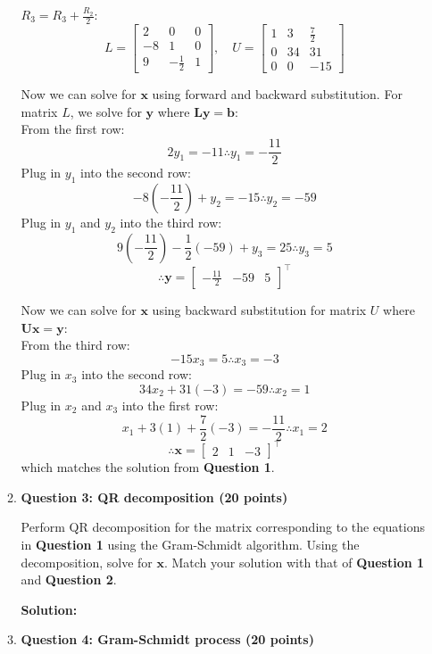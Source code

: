 \documentclass[11pt,letterpaper]{article}
\begin{document}
\begin{enumerate}
\begin{enumerate}
$R_3 = R_3 + \frac{R_2}{2}$:
\[L = \begin{bmatrix}
2 & 0 & 0 \\
-8 & 1 & 0 \\
9 & -\frac{1}{2} & 1
\end{bmatrix}, \quad U = \begin{bmatrix}
1 & 3 & \frac{7}{2} \\
0 & 34 & 31 \\
0 & 0 & -15
\end{bmatrix}\]

Now we can solve for $\mathbf{x}$ using forward and backward substitution. For 
matrix $L$, we solve for $\mathbf{y}$ where $\mathbf{Ly} = \mathbf{b}$: \\
From the first row:
\[2y_1 = -11 \therefore y_1 = -\frac{11}{2}\]
Plug in $y_1$ into the second row:
\[-8(-\frac{11}{2}) + y_2 = -15 \therefore y_2 = -59\]
Plug in $y_1$ and $y_2$ into the third row:
\[9(-\frac{11}{2}) - \frac{1}{2}(-59) + y_3 = 25 \therefore y_3 = 5\]
\[\therefore \mathbf{y} = \begin{bmatrix} -\frac{11}{2} & -59 & 5 \end{bmatrix}^\top\]

Now we can solve for $\mathbf{x}$ using backward substitution for matrix $U$ where $\mathbf{Ux} = \mathbf{y}$: \\
From the third row:
\[-15x_3 = 5 \therefore x_3 = -3\]
Plug in $x_3$ into the second row:
\[34x_2 + 31(-3) = -59 \therefore x_2 = 1\]
Plug in $x_2$ and $x_3$ into the first row:
\[x_1 + 3(1) + \frac{7}{2}(-3) = -\frac{11}{2} \therefore x_1 = 2\]
\[\therefore \mathbf{x} = \begin{bmatrix} 2 & 1 & -3 \end{bmatrix}^\top\] which
matches the solution from \textbf{Question 1}.

\newpage

\item[] \textbf{Question 3: QR decomposition (20 points)} 

Perform QR decomposition for the matrix corresponding to the equations in \textbf{Question 1} using the Gram-Schmidt algorithm. Using the decomposition, solve for $\mathbf{x}$. Match your solution with that of \textbf{Question 1} and \textbf{Question 2}.

\textbf{Solution:}


\newpage

\item[] \textbf{Question 4: Gram-Schmidt process (20 points)} 


\end{enumerate}
\end{enumerate}
\end{document}
